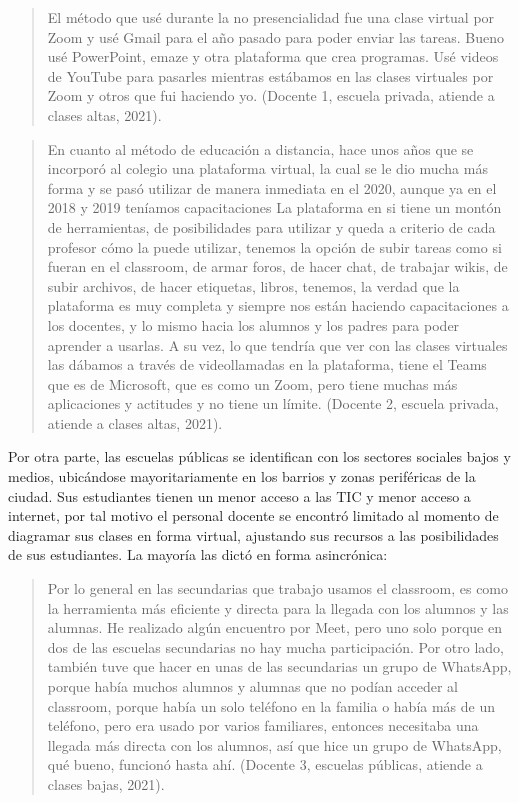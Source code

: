 \documentclass[spanish]{textolivre}
\begin{document}
\begin{quote}
    El método que usé durante la no presencialidad fue una clase virtual por Zoom y usé Gmail para el año pasado para poder enviar las tareas. Bueno usé PowerPoint, emaze y otra plataforma que crea programas. Usé videos de YouTube para pasarles mientras estábamos en las clases virtuales por Zoom y otros que fui haciendo yo. (Docente 1, escuela privada, atiende a clases altas, 2021).
\end{quote}

\begin{quote}
    En cuanto al método de educación a distancia, hace unos años que se incorporó al colegio una plataforma virtual, la cual se le dio mucha más forma y se pasó utilizar de manera inmediata en el 2020, aunque ya en el 2018 y 2019 teníamos capacitaciones La plataforma en si tiene un montón de herramientas, de posibilidades para utilizar y queda a criterio de cada profesor cómo la puede utilizar, tenemos la opción de subir tareas como si fueran en el classroom, de armar foros, de hacer chat, de trabajar wikis, de subir archivos, de hacer etiquetas, libros, tenemos, la verdad que la plataforma es muy completa y siempre nos están haciendo capacitaciones a los docentes, y lo mismo hacia los alumnos y los padres para poder aprender a usarlas. A su vez, lo que tendría que ver con las clases virtuales las dábamos a través de videollamadas en la plataforma, tiene el Teams que es de Microsoft, que es como un Zoom, pero tiene muchas más aplicaciones y actitudes y no tiene un límite. (Docente 2, escuela privada, atiende a clases altas, 2021).
\end{quote}

Por otra parte, las escuelas públicas se identifican con los sectores sociales bajos y medios, ubicándose mayoritariamente en los barrios y zonas periféricas de la ciudad. Sus estudiantes tienen un menor acceso a las TIC y menor acceso a internet, por tal motivo el personal docente se encontró limitado al momento de diagramar sus clases en forma virtual, ajustando sus recursos a las posibilidades de sus estudiantes. La mayoría las dictó en forma asincrónica:

\begin{quote}
    Por lo general en las secundarias que trabajo usamos el classroom, es como la herramienta más eficiente y directa para la llegada con los alumnos y las alumnas. He realizado algún encuentro por Meet, pero uno solo porque en dos de las escuelas secundarias no hay mucha participación. Por otro lado, también tuve que hacer en unas de las secundarias un grupo de WhatsApp, porque había muchos alumnos y alumnas que no podían acceder al classroom, porque había un solo teléfono en la familia o había más de un teléfono, pero era usado por varios familiares, entonces necesitaba una llegada más directa con los alumnos, así que hice un grupo de WhatsApp, qué bueno, funcionó hasta ahí. (Docente 3, escuelas públicas, atiende a clases bajas, 2021).
\end{quote}
\end{document}
